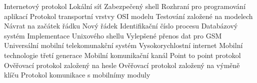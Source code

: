 
\abbrv[IP]     Internetový protokol
\abbrv[LAN]     Lokální síť
\abbrv[SSH]     Zabezpečený shell
\abbrv[API]             Rozhraní pro programování aplikací
\abbrv[TCP]             Protokol transportní vrstvy OSI modelu
\abbrv[MBT]             Testování založené na modelech
\abbrv[CR]              Návrat na začátek řádku
\abbrv[LF]              Nový řádek
\abbrv[PID]             Identifikační číslo procesu
\abbrv[MySQL]           Databázový systém
\abbrv[Bash]            Implementace Unixového shellu
\abbrv[EDGE]            Vylepšené přenos dat pro GSM
\abbrv[UMTS]            Universální mobilní telekomunakční systém
\abbrv[LTE]             Vysokorychlostní internet
\abbrv[3G]              Mobilní technologie třetí generace
\abbrv[CDMA]            Mobilní komunikační kanál
\abbrv[PPP]             Point to point protokol
\abbrv[PAP]             Ověřovací protokol založený na hesle
\abbrv[CHAP]            Ověřovací protokol založený na výměně klíču
\abbrv[AT]              Protokol komunikace s mobilnímy moduly




\stopAbbreviations
\endinput

